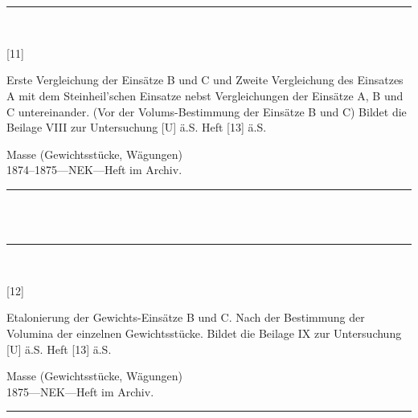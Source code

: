 \\
\vspace*{-2.5pt}\\
\parbox{\textwidth}{%
\rule{\textwidth}{1pt}\vspace*{-3mm}\\
\begin{minipage}[t]{0.15\textwidth}\vspace{0pt}
\Huge\rule[-4mm]{0cm}{1cm}[11]
\end{minipage}
\hfill
\begin{minipage}[t]{0.85\textwidth}\vspace{0pt}
\large Erste Vergleichung der Einsätze B und C und Zweite Vergleichung des Einsatzes A mit dem Steinheil'schen Einsatze nebst Vergleichungen der Einsätze A, B und C untereinander. (Vor der Volums-Bestimmung der Einsätze B und C) Bildet die Beilage VIII zur Untersuchung [U] ä.S. Heft [13] ä.S.\rule[-2mm]{0mm}{2mm}
\end{minipage}
{\footnotesize\flushright
Masse (Gewichtsstücke, Wägungen)\\
}
1874--1875\quad---\quad NEK\quad---\quad Heft im Archiv.\\
\rule{\textwidth}{1pt}
}
\\
\vspace*{-2.5pt}\\
\parbox{\textwidth}{%
\rule{\textwidth}{1pt}\vspace*{-3mm}\\
\begin{minipage}[t]{0.15\textwidth}\vspace{0pt}
\Huge\rule[-4mm]{0cm}{1cm}[12]
\end{minipage}
\hfill
\begin{minipage}[t]{0.85\textwidth}\vspace{0pt}
\large Etalonierung der Gewichts-Einsätze B und C. Nach der Bestimmung der Volumina der einzelnen Gewichtsstücke. Bildet die Beilage IX zur Untersuchung [U] ä.S. Heft [13] ä.S.\rule[-2mm]{0mm}{2mm}
\end{minipage}
{\footnotesize\flushright
Masse (Gewichtsstücke, Wägungen)\\
}
1875\quad---\quad NEK\quad---\quad Heft im Archiv.\\
\rule{\textwidth}{1pt}
}
\\
\vspace*{-2.5pt}\\
